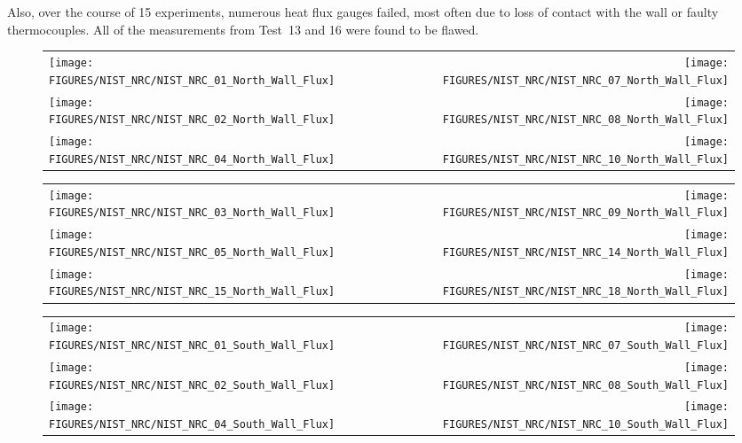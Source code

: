 Also, over the course of 15 experiments, numerous heat flux gauges failed, most often due to loss of contact with the wall or faulty thermocouples. All of the measurements from Test~13 and 16 were found to be flawed.

\newpage

\begin{figure}[p]
\begin{tabular*}{\textwidth}{l@{\extracolsep{\fill}}r}
\texttt{[image: FIGURES/NIST\_NRC/NIST\_NRC\_01\_North\_Wall\_Flux]} &
\texttt{[image: FIGURES/NIST\_NRC/NIST\_NRC\_07\_North\_Wall\_Flux]} \\
\texttt{[image: FIGURES/NIST\_NRC/NIST\_NRC\_02\_North\_Wall\_Flux]} &
\texttt{[image: FIGURES/NIST\_NRC/NIST\_NRC\_08\_North\_Wall\_Flux]} \\
\texttt{[image: FIGURES/NIST\_NRC/NIST\_NRC\_04\_North\_Wall\_Flux]} &
\texttt{[image: FIGURES/NIST\_NRC/NIST\_NRC\_10\_North\_Wall\_Flux]}
\end{tabular*}
\label{NIST_NRC_North_Wall_Flux_Closed}
\end{figure}

\begin{figure}[p]
\begin{tabular*}{\textwidth}{l@{\extracolsep{\fill}}r}
\texttt{[image: FIGURES/NIST\_NRC/NIST\_NRC\_03\_North\_Wall\_Flux]} &
\texttt{[image: FIGURES/NIST\_NRC/NIST\_NRC\_09\_North\_Wall\_Flux]} \\
\texttt{[image: FIGURES/NIST\_NRC/NIST\_NRC\_05\_North\_Wall\_Flux]} &
\texttt{[image: FIGURES/NIST\_NRC/NIST\_NRC\_14\_North\_Wall\_Flux]} \\
\texttt{[image: FIGURES/NIST\_NRC/NIST\_NRC\_15\_North\_Wall\_Flux]} &
\texttt{[image: FIGURES/NIST\_NRC/NIST\_NRC\_18\_North\_Wall\_Flux]}
\end{tabular*}
\label{NIST_NRC_North_Wall_Flux_Open}
\end{figure}

\begin{figure}[p]
\begin{tabular*}{\textwidth}{l@{\extracolsep{\fill}}r}
\texttt{[image: FIGURES/NIST\_NRC/NIST\_NRC\_01\_South\_Wall\_Flux]} &
\texttt{[image: FIGURES/NIST\_NRC/NIST\_NRC\_07\_South\_Wall\_Flux]} \\
\texttt{[image: FIGURES/NIST\_NRC/NIST\_NRC\_02\_South\_Wall\_Flux]} &
\texttt{[image: FIGURES/NIST\_NRC/NIST\_NRC\_08\_South\_Wall\_Flux]} \\
\texttt{[image: FIGURES/NIST\_NRC/NIST\_NRC\_04\_South\_Wall\_Flux]} &
\texttt{[image: FIGURES/NIST\_NRC/NIST\_NRC\_10\_South\_Wall\_Flux]}
\end{tabular*}
\label{NIST_NRC_South_Wall_Flux_Closed}
\end{figure}

